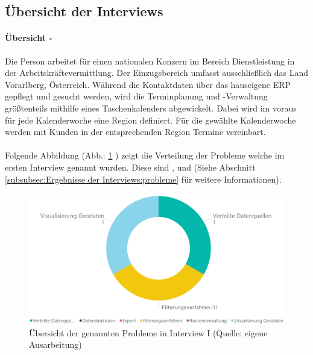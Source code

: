 \documentclass[Bachelorarbeit.tex]{subfiles}
\begin{document}
\subsection{Übersicht der Interviews}
\label{UebersichtDerInterviews}
\paragraph*{Übersicht - } 

Die Person arbeitet für einen nationalen Konzern im Bereich Dienstleistung in der Arbeitskräftevermittlung. 
Der Einzugsbereich umfasst ausschließlich das Land Vorarlberg, Österreich.
Während die Kontaktdaten über das hauseigene \ac{ERP} gepflegt und gesucht werden, wird die Terminplanung und -Verwaltung größtenteils mithilfe eines Taschenkalenders abgewickelt.
Dabei wird im voraus für jede Kalenderwoche eine Region definiert. 
Für die gewählte Kalenderwoche werden mit Kunden in der entsprechenden Region Termine vereinbart.\\
\\
Folgende Abbildung (Abb.: \ref{fig:ProblemeInterview1} ) zeigt die Verteilung der Probleme welche im ersten Interview genannt wurden. 
Diese sind ,  und  (Siehe Abschnitt \ref{subsubsec:Ergebnisse der Interviews:probleme}  für weitere Informationen).

\begin{figure}[h]
\centering
\includegraphics[width=1\linewidth]{img/Interviews/ProblemeInterview1}
\caption[Probleme Interview I]{Übersicht der genannten Probleme in Interview I (Quelle: eigene Ausarbeitung)}
\label{fig:ProblemeInterview1}
\end{figure}
\end{document}
